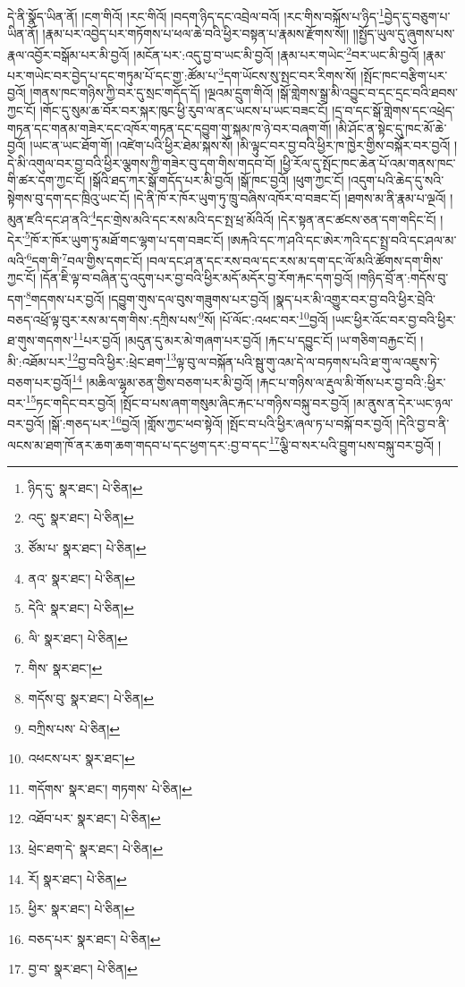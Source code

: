 དེ་ནི་སྣོད་ཡིན་ནོ། །ངག་གིའོ། །རང་གིའོ། །བདག་ཉིད་དང་འབྲེལ་བའོ། །རང་གིས་བསྐོས་པ་ཉིད་\footnote{ཉིད་དུ་  སྣར་ཐང་།  པེ་ཅིན། }བྱེད་དུ་བཅུག་པ་ཡིན་ནོ། །རྣམ་པར་འབྱེད་པར་གཏོགས་པ་ཕལ་ཆེ་བའི་ཕྱིར་བསྟན་པ་རྣམས་རྫོགས་སོ།། །།སྤྱོད་ཡུལ་དུ་ཞུགས་པས་རྣལ་འབྱོར་བསྒོམ་པར་མི་བྱའོ། །མངོན་པར་:འདུ་བྱ་བ་ཡང་མི་བྱའོ། །རྣམ་པར་གཡེང་\footnote{འདུ་  སྣར་ཐང་།  པེ་ཅིན། }བར་ཡང་མི་བྱའོ། །རྣམ་པར་གཡེང་བར་བྱེད་པ་དང་གཏུམ་པོ་དང་གྱ་:ཚོམ་པ་\footnote{ཙོམ་པ་  སྣར་ཐང་།  པེ་ཅིན། }དག་ཡོངས་སུ་སྤང་བར་རིགས་སོ། །སྤོང་ཁང་བརྩིག་པར་བྱའོ། །གནས་ཁང་གཉིས་ཀྱི་བར་དུ་སྲང་གདོད་དོ། །ལྔའམ་དྲུག་གིའོ། །སྒོ་གླེགས་སྒྲ་མི་འབྱུང་བ་དང་དྲང་བའི་ཐབས་ཀྱང་ངོ། །གོང་དུ་སུམ་ཆ་བོར་བར་སྐར་ཁུང་ཕྱི་རུབ་ལ་ནང་ཡངས་པ་ཡང་བཟང་ངོ། །དྲ་བ་དང་སྒོ་གླེགས་དང་འཕྲེད་གཏན་དང་གནམ་གཟེར་དང་འཁོར་གཏན་དང་དབྱུག་གུ་སྐམ་ཁ་ཉེ་བར་བཞག་གོ། །མི་ཤོང་ན་སྟེང་དུ་ཁང་མོ་ཆེ་བྱའོ། །ཡང་ན་ཡང་ཐོག་གོ། །འཛེག་པའི་ཕྱིར་ཐེམ་སྐས་སོ། །མི་ལྟུང་བར་བྱ་བའི་ཕྱིར་ཁ་ཁྱེར་གྱིས་བསྐོར་བར་བྱའོ། །དེ་མི་འགུལ་བར་བྱ་བའི་ཕྱིར་ལྕགས་ཀྱི་གཟེར་བུ་དག་གིས་གདབ་བོ། །ཕྱི་རོལ་དུ་སྤོང་ཁང་ཆེན་པོ་འམ་གནས་ཁང་གི་ཚར་དག་ཀྱང་ངོ། །སྒོའི་ཐད་ཀར་སྒོ་གདོད་པར་མི་བྱའོ། །སྒོ་ཁང་བྱའོ། །ཕུག་ཀྱང་ངོ། །འདུག་པའི་ཆེད་དུ་སའི་སྟེགས་བུ་དག་དང་ཁྲིའུ་ཡང་ངོ། །དེ་ནི་ཁོ་ར་ཁོར་ཡུག་ཏུ་ཁྲུ་བཞིས་འཁོར་བ་བཟང་ངོ། །ཐགས་མ་ནི་རྣམ་པ་ལྔའོ། །མུན་ཛའི་དང་ཤ་ནའི་\footnote{ནའ་  སྣར་ཐང་།  པེ་ཅིན། }དང་གྲེས་མའི་དང་རས་མའི་དང་སྤ་ཕྲ་མོའིའོ། །དེར་སྟན་ནང་ཚངས་ཅན་དག་གདིང་ངོ། །དེར་\footnote{དེའི་  སྣར་ཐང་།  པེ་ཅིན། }ཁོ་ར་ཁོར་ཡུག་ཏུ་མཐོ་གང་ལྷག་པ་དག་བཟང་ངོ། །ཨརྐའི་དང་ཀ་ཤའི་དང་ཨེར་ཀའི་དང་སྤྲ་བའི་དང་ཤལ་མ་ལའི་\footnote{ལི་  སྣར་ཐང་།  པེ་ཅིན། }དག་གི་\footnote{གིས་  སྣར་ཐང་། }བལ་གྱིས་དགང་ངོ། །བལ་དང་ཤ་ན་དང་རས་བལ་དང་རས་མ་དག་དང་ལོ་མའི་ཚོགས་དག་གིས་ཀྱང་ངོ། །དོན་ཇི་ལྟ་བ་བཞིན་དུ་འདུག་པར་བྱ་བའི་ཕྱིར་མདོ་མདོར་བྱ་རོག་རྐང་དག་བྱའོ། །གཉིད་བྲོ་ན་:གདོས་བུ་དག་\footnote{གདོས་བུ་  སྣར་ཐང་།  པེ་ཅིན། }གདགས་པར་བྱའོ། །དབྱུག་གུས་དལ་བུས་གཟུགས་པར་བྱའོ། །སྣད་པར་མི་འགྱུར་བར་བྱ་བའི་ཕྱིར་བྲེའི་བཅད་འཕྲོ་ལྟ་བུར་རས་མ་དག་གིས་:དཀྲིས་པས་\footnote{བཀྲིས་པས་  པེ་ཅིན། }སོ། །པོ་ལོང་:འཕང་བར་\footnote{འཕངས་པར་  སྣར་ཐང་། }བྱའོ། །ཡང་ཕྱིར་འོང་བར་བྱ་བའི་ཕྱིར་ཐ་གུས་གདགས་\footnote{གདོགས་  སྣར་ཐང་། གཏགས་  པེ་ཅིན། }པར་བྱའོ། །མདུན་དུ་མར་མེ་གཞག་པར་བྱའོ། །རྐང་པ་དབྱུང་ངོ། །ཡ་གཅིག་བརྐྱང་ངོ། །མི་:འཐོམ་པར་\footnote{འཐོབ་པར་  སྣར་ཐང་།  པེ་ཅིན། }བྱ་བའི་ཕྱིར་:ཕྲེང་ཐག་\footnote{ཕྲེང་ཐག་དེ་  སྣར་ཐང་།  པེ་ཅིན། }ལྟ་བུ་ལ་བསྐོན་པའི་སྦུ་གུ་འམ་དེ་ལ་བཏགས་པའི་ཐ་གུ་ལ་འཇུས་ཏེ་བཅག་པར་བྱའོ།\footnote{རོ།  སྣར་ཐང་།  པེ་ཅིན། } །མཆིལ་ལྷྭམ་ཅན་གྱིས་བཅག་པར་མི་བྱའོ། །རྐང་པ་གཉིས་ལ་རྡུལ་མི་གོས་པར་བྱ་བའི་:ཕྱིར་བར་\footnote{ཕྱིར་  སྣར་ཐང་།  པེ་ཅིན། }ཏང་གདིང་བར་བྱའོ། །སྤོང་བ་པས་ཞག་གསུམ་ཞིང་རྐང་པ་གཉིས་བསྐུ་བར་བྱའོ། །མ་ནུས་ན་དེར་ཡང་ཉལ་བར་བྱའོ། །སྒོ་:གཅད་པར་\footnote{བཅད་པར་  སྣར་ཐང་།  པེ་ཅིན། }བྱའོ། །གློས་ཀྱང་ཕབ་སྟེའོ། །སྤོང་བ་པའི་ཕྱིར་ཞལ་ཏ་པ་བསྐོ་བར་བྱའོ། །དེའི་བྱ་བ་ནི་ལངས་མ་ཐག་ཁོ་ནར་ཆག་ཆག་གདབ་པ་དང་ཕྱག་དར་:བྱ་བ་དང་\footnote{བྱ་བ་  སྣར་ཐང་།  པེ་ཅིན། }ལྕི་བ་སར་པའི་བྱུག་པས་བསྐུ་བར་བྱའོ། །
